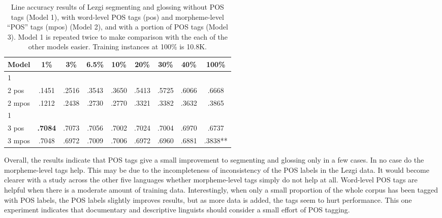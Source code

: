 \begin{table}[]
    \centering
    \begin{tabular}{l|cccccccc}
       \textbf{Model} & \textbf{1\%} & \textbf{3\%} & \textbf{6.5\%} & \textbf{10\%} & \textbf{20\%} & \textbf{30\%} & \textbf{40\%} & \textbf{100\%} \\
      \hline
       1       &  &  &  &  &  &  &   \\
       \hline
       2 pos   & .1451 & .2516 & .3543 & .3650 & .5413 & .5725 & .6066 & .6668  \\
       2 mpos  & .1212 & .2438 & .2730 & .2770 & .3321 & .3382 & .3632 & .3865  \\
       \hline
       \hline
       1       &  &  &  &  &  &  &   \\
       3 pos   & \textbf{.7084} & .7073 & .7056 & .7002 & .7024 & .7004 & .6970 & .6737  \\
       3 mpos  & .7048 & .6972  & .7009 & .7006 & .6972 & .6960 & .6881 & .3838**  \\
    \end{tabular}
    \caption[Segmenting and Glossing with/out POS tags]{Line accuracy results of Lezgi segmenting and glossing without POS tags (Model 1), with word-level POS tags (pos) and morpheme-level ``POS'' tags (mpos) (Model 2), and with a portion of POS tags (Model 3). Model 1 is repeated twice to make comparison with the each of the other models easier. Training instances at 100\% is 10.8K.}
    \label{tab:POSSG}
\end{table}

Overall, the results indicate that POS tags give a small improvement to segmenting and glossing only in a few cases. In no case do the morpheme-level tags help. This may be due to the incompleteness of inconsistency of the POS labels in the Lezgi data. It would become clearer with a study across the other five languages whether morpheme-level tags simply do not help at all. Word-level POS tags are helpful when there is a moderate amount of training data. Interestingly, when only a small proportion of the whole corpus has been tagged with POS labels, the POS labels slightly improves results, but as more data is added, the tags seem to hurt performance. This one experiment indicates that documentary and descriptive linguists should consider a small effort of POS tagging. 
